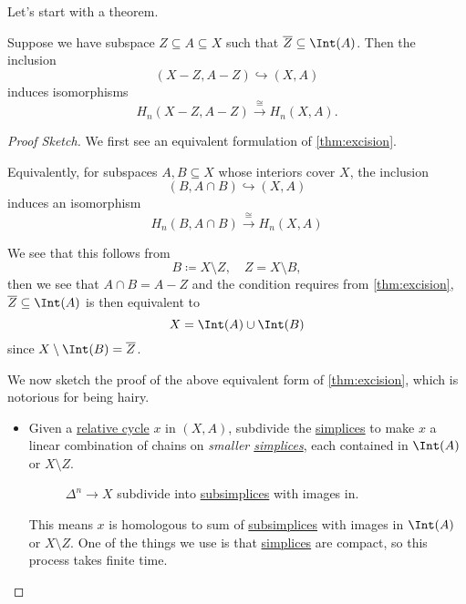 Let's start with a theorem.
\begin{theorem}[Excision]\label{thm:excision}
	Suppose we have subspace \(Z \subseteq A \subseteq X\) such that \(\overline{Z} \subseteq \Int  (A)\). Then the inclusion
	\[
		(X - Z, A - Z) \hookrightarrow (X, A)
	\]
	induces isomorphisms
	\[
		H_n(X - Z, A - Z) \xrightarrow{\cong} H_n(X, A).
	\]
\end{theorem}
\begin{proof}[Proof Sketch]
	We first see an equivalent formulation of \autoref{thm:excision}.
	\begin{remark}
		Equivalently, for subspaces \(A, B \subseteq X\) whose interiors cover \(X\), the inclusion
		\[
			(B, A \cap B) \hookrightarrow (X, A)
		\]
		induces an isomorphism
		\[
			H_n(B, A \cap B) \xrightarrow{\cong} H_n(X, A)
		\]
	\end{remark}
	\begin{explanation}
		We see that this follows from
		\[
			B \coloneqq X \setminus Z,\quad Z = X \setminus B,
		\]
		then we see that \(A \cap B = A - Z\) and the condition requires from \autoref{thm:excision},
		\(\overline{Z} \subseteq \Int (A)\) is then equivalent to
		\[
			X = \Int (A) \cup \Int (B)
		\]
		since \(X \setminus \Int (B) = \overline{Z} \).
		\begin{figure}[H]
			\centering
			\label{fig:eg:excision-1}
		\end{figure}
	\end{explanation}

	We now sketch the proof of the above equivalent form of \autoref{thm:excision}, which is notorious for being hairy.
	\begin{itemize}
		\item Given a \hyperref[def:relative-cycle]{relative cycle} \(x\) in \((X, A)\), subdivide the \hyperref[def:standard-simplex]{simplices} to make \(x\) a
		      linear combination of chains on \emph{smaller \hyperref[def:standard-simplex]{simplices}}, each contained in \(\Int (A)\) or \(X \setminus Z\).
		      \begin{figure}[H]
			      \centering
			      \caption{\(\Delta ^n\to X\) subdivide into \hyperref[def:subsimplex]{subsimplices} with images in. }
			      \label{fig:pf:excision}
		      \end{figure}
		      This means \(x\) is homologous to sum of \hyperref[def:subsimplex]{subsimplices} with images in \(\Int (A)\) or \(X \setminus Z\). One of the things we
		      use is that \hyperref[def:standard-simplex]{simplices} are compact, so this process takes finite time.


\end{itemize}
\end{proof}
